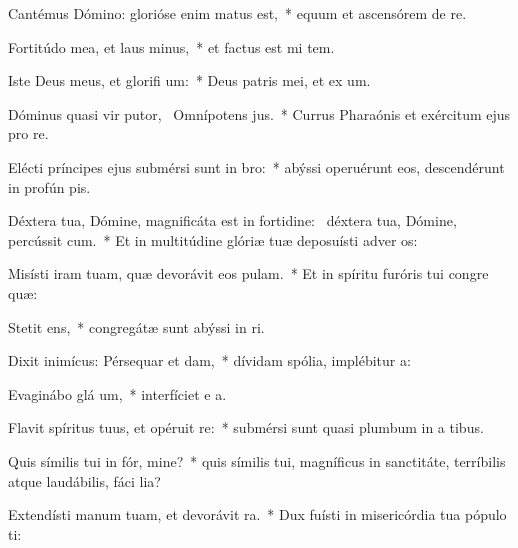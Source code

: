 \item Cantémus Dómino: glorióse enim matus est,~* equum et ascensórem de  re.
\item Fortitúdo mea, et laus  minus,~* et factus est mi  tem.
\item Iste Deus meus, et glorifi um:~* Deus patris mei, et ex um.
\item Dóminus quasi vir putor,~\pscross{} Omnípotens  jus.~* Currus Pharaónis et exércitum ejus pro  re.
\item Elécti príncipes ejus submérsi sunt in  bro:~* abýssi operuérunt eos, descendérunt in profún  pis.
\item Déxtera tua, Dómine, magnificáta est in fortidine:~\pscross{} déxtera tua, Dómine, percússit cum.~* Et in multitúdine glóriæ tuæ deposuísti adver os:
\item Misísti iram tuam, quæ devorávit eos  pulam.~* Et in spíritu furóris tui congre  quæ:
\item Stetit  ens,~* congregátæ sunt abýssi in  ri.
\item Dixit inimícus: Pérsequar et dam,~* dívidam spólia, implébitur  a:
\item Evaginábo glá um,~* interfíciet e  a.
\item Flavit spíritus tuus, et opéruit  re:~* submérsi sunt quasi plumbum in a tibus.
\item Quis símilis tui in fór, mine?~* quis símilis tui, magníficus in sanctitáte, terríbilis atque laudábilis, fáci lia?
\item Extendísti manum tuam, et devorávit  ra.~* Dux fuísti in misericórdia tua pópulo  ti:
